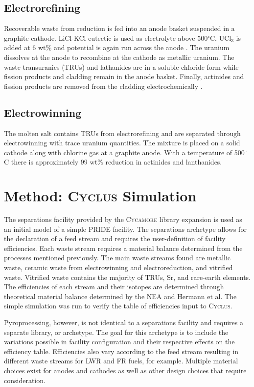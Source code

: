 \documentclass{anstrans}
\newcommand{\Cyclus}{\textsc{Cyclus}\xspace}%
\newcommand{\Cycamore}{\textsc{Cycamore}\xspace}%
\begin{document}
\subsection{Electrorefining}

Recoverable waste from reduction is fed into an anode basket suspended in a graphite cathode. LiCl-KCl eutectic is used as electrolyte above 500$^{\circ}$C. UCl$_3$ is added at 6 wt\% and potential is again run across the anode \cite{flowsheet_1998,lee_korean_2011}. The uranium dissolves at the anode to recombine at the cathode as metallic uranium. The waste transuranics (TRUs) and lathanides are in a soluble chloride form  while fission products and cladding remain in the anode basket. Finally, actinides and fission products are removed from the cladding electrochemically \cite{lee_korean_2011}.

\subsection{Electrowinning}

The molten salt contains TRUs from electrorefining and are separated through electrowinning with trace uranium quantities. The mixture is placed on a solid cathode along with chlorine gas at a graphite anode. With a temperature of 500$^{\circ}$C there is approximately 99 wt\% reduction in actinides and lanthanides. 
\section{Method: \Cyclus Simulation}
The separations facility provided by the \Cycamore library expansion is used as an initial model of a simple PRIDE facility. The separations archetype allows for the declaration of a feed stream and requires the user-definition of facility efficiencies. Each waste stream requires a material balance determined from the processes mentioned previously. The main waste streams found are metallic waste, ceramic waste from electrowinning and electroreduction, and vitrified waste. Vitrified waste contains the majority of TRUs, Sr, and rare-earth elements. The efficiencies of each stream and their isotopes are determined through theoretical material balance determined by the NEA and Hermann et al\cite{flowsheet_1998,herrmann_separation_2010}. The simple simulation was run to verify the table of efficiencies input to \Cyclus.

Pyroprocessing, however, is not identical to a separations facility and requires a separate library, or archetype. The goal for this archetype is to include the variations possible in facility configuration and their respective effects on the efficiency table. Efficiencies also vary according to the feed stream resulting in different waste streams for LWR and FR fuels, for example. Multiple material choices exist for anodes and cathodes as well as other design choices that require consideration. 
\end{document}
